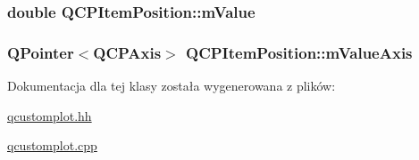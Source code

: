\subsubsection[{\texorpdfstring{m\+Value}{mValue}}]{\setlength{\rightskip}{0pt plus 5cm}double Q\+C\+P\+Item\+Position\+::m\+Value\hspace{0.3cm}{\ttfamily [protected]}}\hypertarget{class_q_c_p_item_position_a67bf5df69f587d53731724a7d61c6c3f}{}\label{class_q_c_p_item_position_a67bf5df69f587d53731724a7d61c6c3f}
\subsubsection[{\texorpdfstring{m\+Value\+Axis}{mValueAxis}}]{\setlength{\rightskip}{0pt plus 5cm}Q\+Pointer$<${\bf Q\+C\+P\+Axis}$>$ Q\+C\+P\+Item\+Position\+::m\+Value\+Axis\hspace{0.3cm}{\ttfamily [protected]}}\hypertarget{class_q_c_p_item_position_a505dc2da24ba274452c1c817fcaba011}{}\label{class_q_c_p_item_position_a505dc2da24ba274452c1c817fcaba011}


Dokumentacja dla tej klasy została wygenerowana z plików\+:\begin{DoxyCompactItemize}
\item 
\hyperlink{qcustomplot_8hh}{qcustomplot.\+hh}\item 
\hyperlink{qcustomplot_8cpp}{qcustomplot.\+cpp}\end{DoxyCompactItemize}
